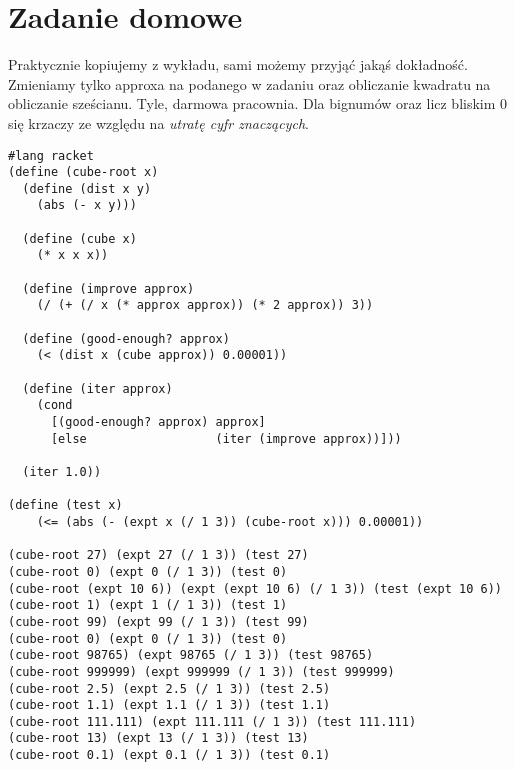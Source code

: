 \documentclass[a4paper]{article}
\begin{document}
\section{Zadanie domowe}
Praktycznie kopiujemy z wykładu, sami możemy przyjąć jakąś dokładność. Zmieniamy tylko approxa na podanego w zadaniu oraz obliczanie kwadratu na obliczanie sześcianu. Tyle, darmowa pracownia. Dla bignumów oraz licz bliskim 0 się krzaczy ze względu na \textit{utratę cyfr znaczących}.
\begin{lstlisting}
#lang racket
(define (cube-root x)
  (define (dist x y)
    (abs (- x y)))

  (define (cube x)
    (* x x x))

  (define (improve approx)
    (/ (+ (/ x (* approx approx)) (* 2 approx)) 3))

  (define (good-enough? approx)
    (< (dist x (cube approx)) 0.00001))

  (define (iter approx)
    (cond
      [(good-enough? approx) approx]
      [else                  (iter (improve approx))]))
  
  (iter 1.0))

(define (test x)
    (<= (abs (- (expt x (/ 1 3)) (cube-root x))) 0.00001))

(cube-root 27) (expt 27 (/ 1 3)) (test 27)
(cube-root 0) (expt 0 (/ 1 3)) (test 0)
(cube-root (expt 10 6)) (expt (expt 10 6) (/ 1 3)) (test (expt 10 6))
(cube-root 1) (expt 1 (/ 1 3)) (test 1)
(cube-root 99) (expt 99 (/ 1 3)) (test 99)
(cube-root 0) (expt 0 (/ 1 3)) (test 0)
(cube-root 98765) (expt 98765 (/ 1 3)) (test 98765)
(cube-root 999999) (expt 999999 (/ 1 3)) (test 999999)
(cube-root 2.5) (expt 2.5 (/ 1 3)) (test 2.5)
(cube-root 1.1) (expt 1.1 (/ 1 3)) (test 1.1)
(cube-root 111.111) (expt 111.111 (/ 1 3)) (test 111.111)
(cube-root 13) (expt 13 (/ 1 3)) (test 13)
(cube-root 0.1) (expt 0.1 (/ 1 3)) (test 0.1)

\end{lstlisting}  
\end{document}
